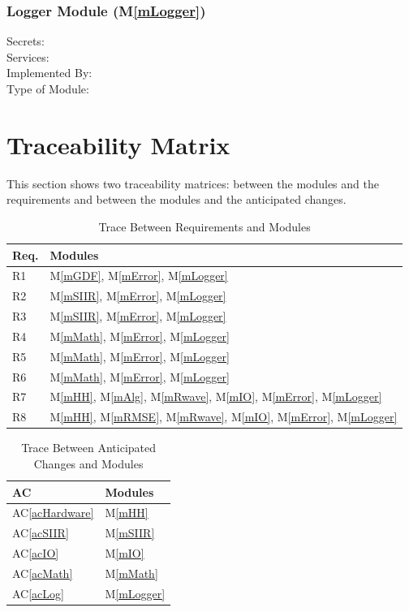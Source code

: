 \documentclass[12pt, titlepage]{article}
\newcommand{\acref}[1]{AC\ref{#1}}
\newcommand{\mref}[1]{M\ref{#1}}
\begin{document}
\subsubsection{Logger Module (\mref{mLogger})}

\begin{description}
\item[Secrets:]
\item[Services:]
\item[Implemented By:] \progname
\item[Type of Module:]
\end{description}

\section{Traceability Matrix} \label{SecTM}

This section shows two traceability matrices: between the modules and the
requirements and between the modules and the anticipated changes.

\begin{table}[H]
\centering
\begin{tabular}{p{} p{}}
\toprule
\textbf{Req.} & \textbf{Modules}\\
\midrule
R1 & \mref{mGDF}, \mref{mError}, \mref{mLogger}\\
R2 & \mref{mSIIR}, \mref{mError}, \mref{mLogger}\\
R3 & \mref{mSIIR}, \mref{mError}, \mref{mLogger}\\
R4 & \mref{mMath}, \mref{mError}, \mref{mLogger}\\
R5 & \mref{mMath}, \mref{mError}, \mref{mLogger}\\
R6 & \mref{mMath}, \mref{mError}, \mref{mLogger}\\
R7 & \mref{mHH}, \mref{mAlg}, \mref{mRwave}, \mref{mIO}, \mref{mError}, \mref{mLogger}\\
R8 & \mref{mHH}, \mref{mRMSE}, \mref{mRwave}, \mref{mIO}, \mref{mError}, \mref{mLogger}\\
\bottomrule
\end{tabular}
\caption{Trace Between Requirements and Modules}
\label{TblRT}
\end{table}

\begin{table}[H]
\centering
\begin{tabular}{p{} p{}}
\toprule
\textbf{AC} & \textbf{Modules}\\
\midrule
\acref{acHardware} & \mref{mHH}\\
\acref{acSIIR} & \mref{mSIIR}\\
\acref{acIO} & \mref{mIO}\\
\acref{acMath} & \mref{mMath}\\
\acref{acLog} & \mref{mLogger}\\
\bottomrule
\end{tabular}
\caption{Trace Between Anticipated Changes and Modules}
\label{TblACT}
\end{table}
\end{document}
